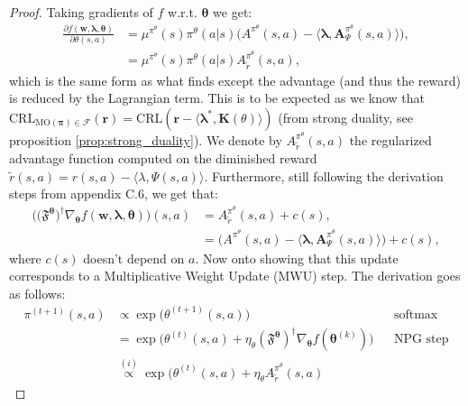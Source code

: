 \begin{proof}
Taking gradients of $f$ w.r.t. $\bm{\theta}$ we get:
\begin{equation}
    \label{eq:NPG_Grad_step}
    \begin{aligned}
        \frac{\partial f(\bm{w},\bm{\lambda},\bm{\theta})}{\partial \theta(s,a)} &= \mu^{\pi^\theta}(s) \pi^\theta (a|s) \bigl( A^{\pi^\theta}(s,a) -\langle \bm{\lambda} , \bm{A}_\Psi^{\pi^\theta}(s,a) \rangle \bigr),\\
        &= \mu^{\pi^\theta}(s) \pi^\theta (a|s) A_{ \tilde{r}}^{\pi^\theta}(s,a),
    \end{aligned}
\end{equation}
which is the same form as what \cite{Cen2021} finds except the advantage (and thus the reward) is reduced by the Lagrangian term. This is to be expected as we know that $\text{CRL}_{\text{MO}(\bm{\pi}) \in \mathcal{F}}(\bm{r}) = \text{CRL}(\bm{r} - \langle \bm{\lambda}^*, \bm{K}(\theta) \rangle)$ (from strong duality, see proposition \ref{prop:strong_duality}). We denote by $ A_{ \tilde{r}}^{\pi^\theta}(s,a)$ the regularized advantage function computed on the diminished reward $\tilde{r}(s,a) = r(s,a) - \langle \lambda, \Psi(s,a) \rangle$. Furthermore, still following the derivation steps from \cite{Cen2021} appendix C.6, we get that:
\begin{equation}
    \label{eq:NPG_Fisher_step}
    \begin{aligned}
        \Big(\bigl(\mathfrak{F}^{\bm{\theta}}\bigr)^\dagger\nabla_{\bm{\theta}} f(\bm{w},\bm{\lambda},\bm{\theta})\Big)(s,a) &=  
        A_{ \tilde{r}}^{\pi^\theta}(s,a)
         + c(s),\\
        &=  \bigl( A^{\pi^\theta}(s,a) -\langle \bm{\lambda} , \bm{A}_\Psi^{\pi^\theta}(s,a) \rangle \bigr) + c(s), 
    \end{aligned}
\end{equation}
where $c(s)$ doesn't depend on $a$. Now onto showing that this update corresponds to a Multiplicative Weight Update (MWU) step. The derivation goes as follows:
\begin{align*}
    \pi^{(t+1)}(s,a) &\propto \exp\big(
         \theta^{(t+1)}(s,a) 
         \big) && \text{softmax} \\
    &= \exp\big(
        \theta^{(t)}(s,a) 
        + \eta_\theta 
        (\mathfrak{F}^{\bm{\theta}})^\dagger
        \nabla_{\bm{\theta}} 
        f(\bm{\theta}^{(k)})
    \big) && \text{NPG step} \\
    &\stackrel{(i)}{\propto} \exp\big(
        \theta^{(t)}(s,a) 
        + \eta_\theta 
        A_{ \tilde{r}}^{\pi^\theta}(s,a)

\end{align*}
\end{proof}
